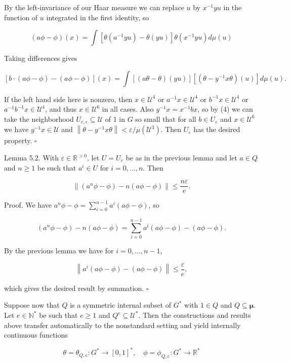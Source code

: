 \documentclass[10pt]{article}
\begin{document}
By the left-invariance of our Haar measure we can replace $u$ by $x^{-1} y u$ in the function of $u$ integrated in the first identity, so

$$
(a \phi-\phi)(x)=\int\left[\theta\left(a^{-1} y u\right)-\theta(y u)\right] \theta\left(x^{-1} y u\right) d \mu(u)
$$

Taking differences gives

$$
[b \cdot(a \phi-\phi)-(a \phi-\phi)](x)=\int[(a \theta-\theta)(y u)]\left[\left(\theta-y^{-1} x \theta\right)(u)\right] d \mu(u) .
$$

If the left hand side here is nonzero, then $x \in \mathcal{U}^{4}$ or $a^{-1} x \in \mathcal{U}^{4}$ or $b^{-1} x \in \mathcal{U}^{4}$ or $a^{-1} b^{-1} x \in \mathcal{U}^{4}$, and thus $x \in \mathcal{U}^{6}$ in all cases. Also $y^{-1} x=x^{-1} b x$, so by (4) we can take the neighborhood $U_{c, \varepsilon} \subseteq \mathcal{U}$ of 1 in $G$ so small that for all $b \in U_{\varepsilon}$ and $x \in \mathcal{U}^{6}$ we have $y^{-1} x \in \mathcal{U}$ and $\left\|\theta-y^{-1} x \theta\right\|<\varepsilon / \mu\left(\mathcal{U}^{3}\right)$. Then $U_{\varepsilon}$ has the desired property. \(\square\)

Lemma 5.2. With $\varepsilon \in \mathbb{R}^{>0}$, let $U=U_{\varepsilon}$ be as in the previous lemma and let $a \in Q$ and $n \geq 1$ be such that $a^{i} \in U$ for $i=0, \ldots, n$. Then

$$
\left\|\left(a^{n} \phi-\phi\right)-n(a \phi-\phi)\right\| \leq \frac{n \varepsilon}{e} .
$$

Proof. We have $a^{n} \phi-\phi=\sum_{i=0}^{n-1} a^{i}(a \phi-\phi)$, so

$$
\left(a^{n} \phi-\phi\right)-n(a \phi-\phi)=\sum_{i=0}^{n-1} a^{i}(a \phi-\phi)-(a \phi-\phi) .
$$

By the previous lemma we have for $i=0, \ldots, n-1$,

$$
\left\|a^{i}(a \phi-\phi)-(a \phi-\phi)\right\| \leq \frac{\varepsilon}{e},
$$

which gives the desired result by summation. \(\square\)

Suppose now that $Q$ is a symmetric internal subset of $G^{*}$ with $1 \in Q$ and $Q \subseteq \boldsymbol{\mu}$. Let $e \in \mathbb{N}^{*}$ be such that $e \geq 1$ and $Q^{e} \subseteq \mathcal{U}^{*}$. Then the constructions and results above transfer automatically to the nonstandard setting and yield internally continuous functions

$$
\theta=\theta_{Q, e}: G^{*} \rightarrow[0,1]^{*}, \quad \phi=\phi_{Q, e}: G^{*} \rightarrow \mathbb{R}^{*}
$$
\end{document}
